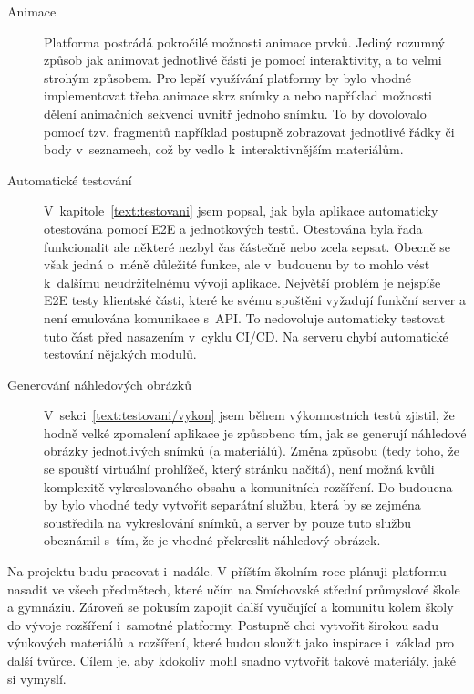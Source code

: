 \begin{description}
  \item[Animace] Platforma postrádá pokročilé možnosti animace prvků.
  Jediný rozumný způsob jak animovat jednotlivé části je pomocí interaktivity, a to velmi strohým způsobem.
  Pro lepší využívání platformy by bylo vhodné implementovat třeba animace skrz snímky a nebo například možnosti dělení animačních sekvencí uvnitř jednoho snímku.
  To by dovolovalo pomocí tzv. fragmentů například postupně zobrazovat jednotlivé řádky či body v~seznamech, což by vedlo k~interaktivnějším materiálům.

  \item[Automatické testování] V~kapitole~\ref{text:testovani} jsem popsal, jak byla aplikace automaticky otestována pomocí E2E a jednotkových testů. 
  Otestována byla řada funkcionalit ale některé nezbyl čas částečně nebo zcela sepsat.
  Obecně se však jedná o~méně důležité funkce, ale v~budoucnu by to mohlo vést k~dalšímu neudržitelnému vývoji aplikace.
  Největší problém je nejspíše E2E testy klientské části, které ke svému spuštěni vyžadují funkční server a není emulována komunikace s~API.
  To nedovoluje automaticky testovat tuto část před nasazením v~cyklu CI/CD.
  Na serveru chybí automatické testování nějakých modulů.

  \item[Generování náhledových obrázků] V~sekci~\ref{text:testovani/vykon} jsem během výkonnostních testů zjistil, že hodně velké zpomalení aplikace je způsobeno tím, jak se generují náhledové obrázky jednotlivých snímků (a materiálů).
  Změna způsobu (tedy toho, že se spouští virtuální prohlížeč, který stránku načítá), není možná kvůli komplexitě vykreslovaného obsahu a komunitních rozšíření.
  Do budoucna by bylo vhodné tedy vytvořit separátní službu, která by se zejména soustředila na vykreslování snímků, a server by pouze tuto službu obeznámil s~tím, že je vhodné překreslit náhledový obrázek.
\end{description}

Na projektu budu pracovat i~nadále. 
V příštím školním roce plánuji platformu nasadit ve všech předmětech, které učím na Smíchovské střední průmyslové škole a gymnáziu.
Zároveň se pokusím zapojit další vyučující a komunitu kolem školy do vývoje rozšíření i~samotné platformy.
Postupně chci vytvořit širokou sadu výukových materiálů a rozšíření, které budou sloužit jako inspirace i~základ pro další tvůrce. 
Cílem je, aby kdokoliv mohl snadno vytvořit takové materiály, jaké si vymyslí.
